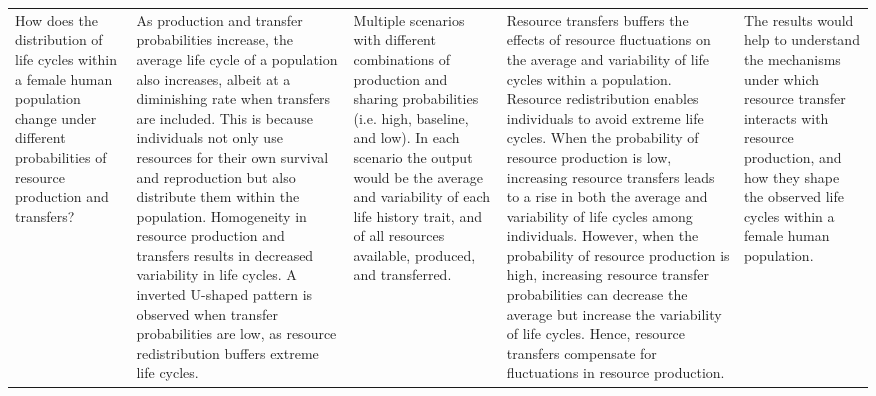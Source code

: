 \documentclass{article}
\begin{document}
\begin{table}[H]
\begin{adjustbox}{width=\textwidth}
\begin{tabular}{p{4cm}p{4cm}p{4cm}p{4cm}p{4cm} }
    How does the distribution of life cycles within a female human population change under different probabilities of resource production and transfers? & As production and transfer probabilities increase, the average life cycle of a population also increases, albeit at a diminishing rate when transfers are included. This is because individuals not only use resources for their own survival and reproduction but also distribute them within the population. Homogeneity in resource production and transfers results in decreased variability in life cycles. A inverted U-shaped pattern is observed when transfer probabilities are low, as resource redistribution buffers extreme life cycles. & Multiple scenarios with different combinations of production and sharing probabilities (i.e. high, baseline, and low). In each scenario the output would be the average and variability of each life history trait, and of all resources available, produced, and transferred. & Resource transfers buffers the effects of resource fluctuations on the average and variability of life cycles within a population. Resource redistribution enables individuals to avoid extreme life cycles. When the probability of resource production is low, increasing resource transfers leads to a rise in both the average and variability of life cycles among individuals. However, when the probability of resource production is high, increasing resource transfer probabilities can decrease the average but increase the variability of life cycles. Hence, resource transfers compensate for fluctuations in resource production. & The results would help to understand the mechanisms under which resource transfer interacts with resource production, and how they shape the observed life cycles within a female human population.\\
    

\end{tabular}
\end{adjustbox}
\end{table}
\end{document}
